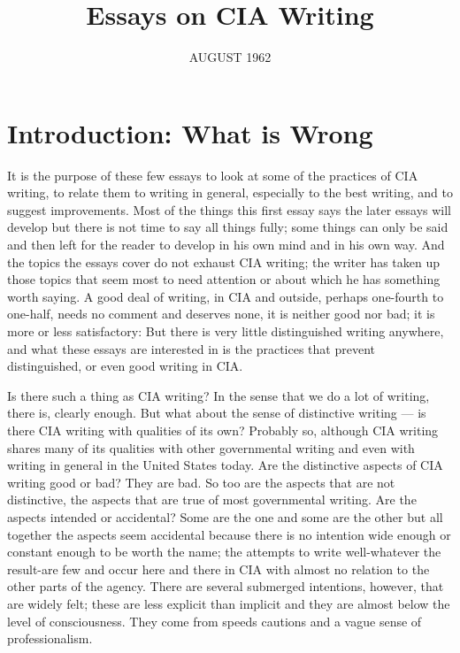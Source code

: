 \documentclass[
    oneside,
    11pt,
    draft
]{memoir}
\title{Essays on CIA Writing}
\author{}
\date{AUGUST 1962}
\begin{document}
\frontmatter

\maketitle
\mainmatter{}
\tableofcontents*
\thispagestyle{empty}

\newpage

\chapter{Introduction: What is Wrong}
It is the purpose of these few essays to look at some of the practices of CIA writing, to relate them to writing in general, especially to the best writing, and to suggest improvements. Most of the things this first essay says the later essays will develop but there is not time to say all things fully; some things can only be said and then left for the reader to develop in his own mind and in his own way. And the topics the essays cover do not exhaust CIA writing; the writer has taken up those topics that seem most to need attention or about which he has something worth saying. A good deal of writing, in CIA and outside, perhaps one-fourth to one-half, needs no comment and deserves none, it is neither good nor bad; it is more or less satisfactory: But there is very little distinguished writing anywhere, and what these essays are interested in is the practices that prevent distinguished, or even good writing in CIA.

Is there such a thing as CIA writing? In the sense that we do a lot of writing, there is, clearly enough. But what about the sense of distinctive writing --- is there CIA writing with qualities of its own? Probably so, although CIA writing shares many of its qualities with other governmental writing and even with writing in general in the United States today. Are the distinctive aspects of CIA writing good or bad? They are bad. So too are the aspects that are not distinctive, the aspects that are true of most governmental writing. Are the aspects intended or accidental? Some are the one and some are the other but all together the aspects seem accidental because there is no intention wide enough or constant enough to be worth the name; the attempts to write well-whatever the result-are few and occur here and there in CIA with almost no relation to the other parts of the agency. There are several submerged intentions, however, that are widely felt; these are less explicit than implicit and they are almost below the level of consciousness. They come from speeds cautions and a vague sense of professionalism.
\end{document}

